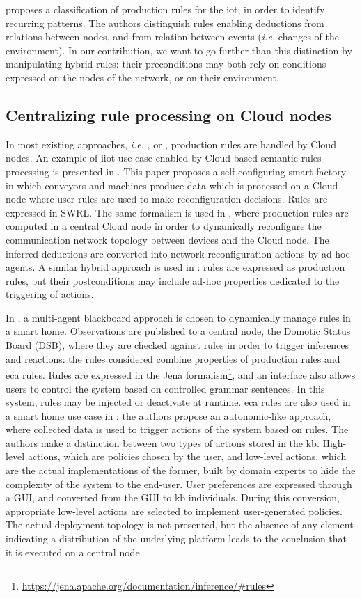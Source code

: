 \documentclass{iosart2c}
\begin{document}
\cite{Sun2014} proposes a classification of production rules for the \gls{iot}, in order to identify recurring patterns.
The authors distinguish rules enabling deductions from relations between nodes, and from relation between events (\textit{i.e.} changes of the environment).
In our contribution, we want to go further than this distinction by manipulating hybrid rules: their preconditions may both rely on conditions expressed on the nodes of the network, or on their environment.

\subsection{Centralizing rule processing on Cloud nodes}

In most existing approaches, \textit{i.e.} \cite{ZangLi55}, \cite{Gyrard2017} or \cite{xu2017network}, production rules are handled by Cloud nodes.
An example of \gls{iiot} use case enabled by Cloud-based semantic rules processing is presented in \cite{Wang2018}.
This paper proposes a self-configuring smart factory in which conveyors and machines produce data which is processed on a Cloud node where user rules are used to make reconfiguration decisions.
Rules are expressed in SWRL.
The same formalism is used in \cite{Rodriguez2010}, where production rules are computed in a central Cloud node in order to dynamically reconfigure the communication network topology between devices and the Cloud node.
The inferred deductions are converted into network reconfiguration actions by ad-hoc agents.
A similar hybrid approach is used in \cite{Evchina2015}: rules are expressed as production rules, but their postconditions may include ad-hoc properties dedicated to the triggering of actions.

In \cite{Kasnesis2015}, a multi-agent blackboard approach is chosen to dynamically manage rules in a smart home. 
Observations are published to a central node, the Domotic Status Board (DSB), where they are checked against rules in order to trigger inferences and reactions: the rules considered combine properties of production rules and \gls{eca} rules.
Rules are expressed in the Jena formalism\footnote{\url{https://jena.apache.org/documentation/inference/\#rules}}, and an interface also allows users to control the system based on controlled grammar sentences.
In this system, rules may be injected or deactivate at runtime.
\gls{eca} rules are also used in a smart home use case in \cite{Mainetti2015}: the authors propose an autonomic-like approach, where collected data is used to trigger actions of the system based on rules.
The authors make a distinction between two types of actions stored in the \gls{kb}. 
High-level actions, which are policies chosen by the user, and low-level actions, which are the actual implementations of the former, built by domain experts to hide the complexity of the system to the end-user.
User preferences are expressed through a GUI, and converted from the GUI to \gls{kb} individuals. 
During this conversion, appropriate low-level actions are selected to implement user-generated policies.
The actual deployment topology is not presented, but the absence of any element indicating a distribution of the underlying platform leads to the conclusion that it is executed on a central node.
\end{document}
